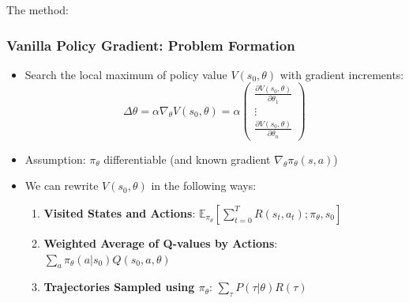\documentclass{article}
\begin{document}
The method:
\begin{thmbox}
    \subsubsection*{Vanilla Policy Gradient: Problem Formation}
    \begin{itemize}
    \item Search the local maximum of policy value $V(s_0, \theta)$ with gradient increments:
        \begin{equation*}
            \Delta \theta = \alpha \nabla_{\theta} V(s_0, \theta) = \alpha
            \begin{pmatrix}
                \frac{\partial V(s_0, \theta)}{\partial \theta_{1}} \\
                \vdots \\
                \frac{\partial V(s_0, \theta)}{\partial \theta_{n}}
            \end{pmatrix}
        \end{equation*}
    \item Assumption: $\pi_{\theta}$ differentiable (and known gradient $\nabla_{\theta} \pi_{\theta}(s, a)$)
    \item We can rewrite $V(s_0, \theta)$ in the following ways:
        \begin{enumerate}
        \item \textbf{Visited States and Actions}: 
            $\mathbb{E}_{\pi_{\theta}} \left[ \sum_{t = 0}^{T} R(s_t, a_t); \pi_{\theta}, s_0 \right]$
        \item \textbf{Weighted Average of Q-values by Actions}:
            $\sum_{a} \pi_{\theta} (a | s_0) Q(s_0, a, \theta)$
        \item \textbf{Trajectories Sampled using $\pi_{\theta}$}: 
            $\sum_{\tau} P(\tau | \theta) R(\tau)$
        \end{enumerate}
    \end{itemize}
\end{thmbox}
\end{document}
